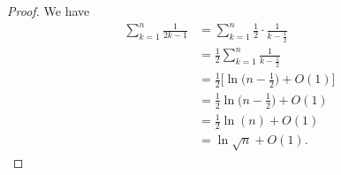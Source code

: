 \begin{proof}
  We have
  \begin{equation*}
    \begin{split}
      \sum_{k = 1}^n \frac{1}{2k - 1}
      &= \sum_{k = 1}^n \frac{1}{2} \cdot \frac{1}{k - \frac{1}{2}} \\
      &= \frac{1}{2} \sum_{k = 1}^n \frac{1}{k - \frac{1}{2}} \\
      &= \frac{1}{2} \biggl[\ln{\biggl(n - \frac{1}{2}\biggr)} + O(1)\biggr] \\
      &= \frac{1}{2} \ln{\biggl(n - \frac{1}{2}\biggr)} + O(1) \\
      &= \frac{1}{2} \ln(n) + O(1) \\
      &= \ln{\sqrt{n}} + O(1).
    \end{split}
  \end{equation*}
\end{proof}
